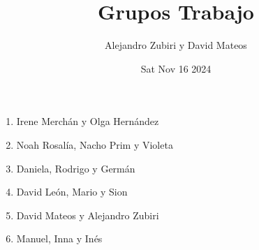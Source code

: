 \documentclass{article}
\author{Alejandro Zubiri y David Mateos}
\date{Sat Nov 16 2024}
\title{Grupos Trabajo}
\begin{document}
\maketitle
\begin{enumerate}
    \item Irene Merchán y Olga Hernández
    \item Noah Rosalía, Nacho Prim y Violeta
    \item Daniela, Rodrigo y Germán
    \item David León, Mario y Sion
    \item David Mateos y Alejandro Zubiri
    \item Manuel, Inna y Inés
\end{enumerate}
\end{document}
